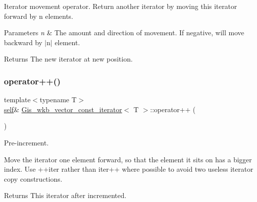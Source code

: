 Iterator movement operator. Return another iterator by moving this iterator forward by n elements. 
\begin{DoxyParams}{Parameters}
{\em n} & The amount and direction of movement. If negative, will move backward by $\vert$n$\vert$ element. \\
\hline
\end{DoxyParams}
\begin{DoxyReturn}{Returns}
The new iterator at new position. 
\end{DoxyReturn}
\mbox{\label{classGis__wkb__vector__const__iterator_a9cf0ed3395c51ed8c7280d0184b7ce66}} 
\subsubsection{\texorpdfstring{operator++()}{operator++()}\hspace{0.1cm}{\footnotesize\ttfamily [1/2]}}
{\footnotesize\ttfamily template$<$typename T$>$ \\
\mbox{\hyperlink{classGis__wkb__vector__const__iterator}{self}}\& \mbox{\hyperlink{classGis__wkb__vector__const__iterator}{Gis\+\_\+wkb\+\_\+vector\+\_\+const\+\_\+iterator}}$<$ T $>$\+::operator++ (\begin{DoxyParamCaption}{ }\end{DoxyParamCaption})\hspace{0.3cm}{\ttfamily [inline]}}



Pre-\/increment. 

Move the iterator one element forward, so that the element it sits on has a bigger index. Use ++iter rather than iter++ where possible to avoid two useless iterator copy constructions. \begin{DoxyReturn}{Returns}
This iterator after incremented. 
\end{DoxyReturn}
\mbox{\label{classGis__wkb__vector__const__iterator_a82e26fad2ec2115454fbfeb90675f42c}} 
